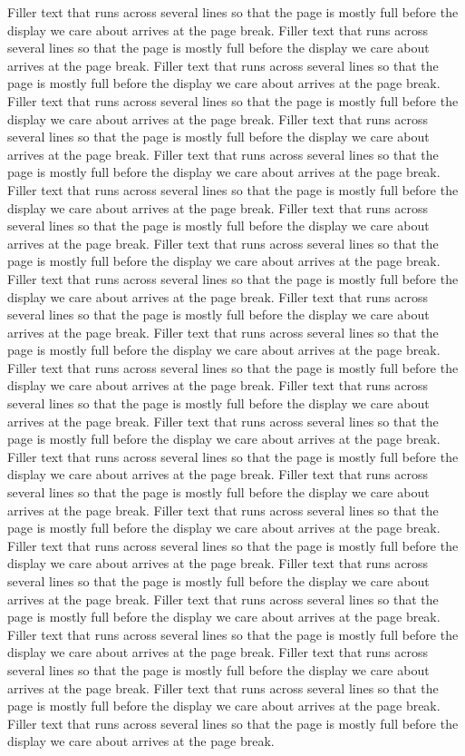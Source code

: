 \documentclass[10pt]{article}
\begin{document}
Filler text that runs across several lines so that the page is mostly full before the display we care about arrives at the page break. Filler text that runs across several lines so that the page is mostly full before the display we care about arrives at the page break. Filler text that runs across several lines so that the page is mostly full before the display we care about arrives at the page break. Filler text that runs across several lines so that the page is mostly full before the display we care about arrives at the page break. Filler text that runs across several lines so that the page is mostly full before the display we care about arrives at the page break. Filler text that runs across several lines so that the page is mostly full before the display we care about arrives at the page break. Filler text that runs across several lines so that the page is mostly full before the display we care about arrives at the page break. Filler text that runs across several lines so that the page is mostly full before the display we care about arrives at the page break. Filler text that runs across several lines so that the page is mostly full before the display we care about arrives at the page break. Filler text that runs across several lines so that the page is mostly full before the display we care about arrives at the page break. Filler text that runs across several lines so that the page is mostly full before the display we care about arrives at the page break. Filler text that runs across several lines so that the page is mostly full before the display we care about arrives at the page break. Filler text that runs across several lines so that the page is mostly full before the display we care about arrives at the page break. Filler text that runs across several lines so that the page is mostly full before the display we care about arrives at the page break. Filler text that runs across several lines so that the page is mostly full before the display we care about arrives at the page break. Filler text that runs across several lines so that the page is mostly full before the display we care about arrives at the page break. Filler text that runs across several lines so that the page is mostly full before the display we care about arrives at the page break. Filler text that runs across several lines so that the page is mostly full before the display we care about arrives at the page break. Filler text that runs across several lines so that the page is mostly full before the display we care about arrives at the page break. Filler text that runs across several lines so that the page is mostly full before the display we care about arrives at the page break. Filler text that runs across several lines so that the page is mostly full before the display we care about arrives at the page break. Filler text that runs across several lines so that the page is mostly full before the display we care about arrives at the page break. Filler text that runs across several lines so that the page is mostly full before the display we care about arrives at the page break. Filler text that runs across several lines so that the page is mostly full before the display we care about arrives at the page break. Filler text that runs across several lines so that the page is mostly full before the display we care about arrives at the page break. 
\end{document}
